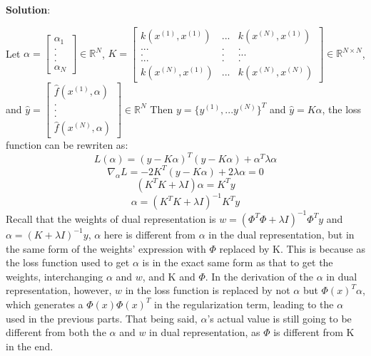 \documentclass{article} %
\begin{document}
\textbf{Solution}:

Let $\alpha = \begin{bmatrix} \alpha_1 \\.\\.\\.\\ \alpha_N \end{bmatrix} \in \mathbb{R}^N$,
$K = \begin{bmatrix} k(x^{(1)}, x^{(1)}) &...& k(x^{(N)}, x^{(1)}) \\ ...& . & . \\  . & . & ...\\ ...& . & . \\k(x^{(N)}, x^{(1)}) &...& k(x^{(N)}, x^{(N)}) \end{bmatrix}\in \mathbb{R}^{N \times N}$,
and
$\hat y = \begin{bmatrix} \hat f(x^{(1)}, \alpha)\\.\\.\\.\\ \hat f(x^{(N)}, \alpha) \end{bmatrix} \in \mathbb{R}^N$
Then $y = \{y^{(1)}, ... y^{(N)}\}^T$ and $\hat y = K\alpha$, the loss function can be rewriten as:
$$L(\alpha) = (y-K\alpha)^T(y-K\alpha)+ \alpha^T\lambda\alpha$$
$$\nabla_\alpha L = -2K^T(y-K\alpha)+ 2\lambda\alpha = 0$$
$$(K^TK+\lambda I)\alpha = K^Ty$$
$$\alpha = (K^TK+\lambda I)^{-1}K^Ty$$
Recall that the weights of dual representation is $w = (\Phi^T\Phi+\lambda I)^{-1}\Phi^Ty$ and $\alpha = (K + \lambda I)^{-1}y$, $\alpha$ here is different from $\alpha$ in the dual representation, but in the same form of the weights' expression with $\Phi$ replaced by K. This is because as the loss function used to get $\alpha$ is in the exact same form as that to get the weights, interchanging $\alpha$ and $w$, and K and $\Phi$. In the derivation of the $\alpha$ in dual representation, however, $w$ in the loss function is replaced by not $\alpha$ but $\Phi(x)^T\alpha$, which generates a  $\Phi(x)\Phi(x)^T$ in the regularization term, leading to the $\alpha$ used in the previous parts. That being said, $\alpha$'s actual value is still going to be different from both the $\alpha$ and $w$ in dual representation, as $\Phi$ is different from K in the end.







\vspace{0.4cm}
\end{document}
